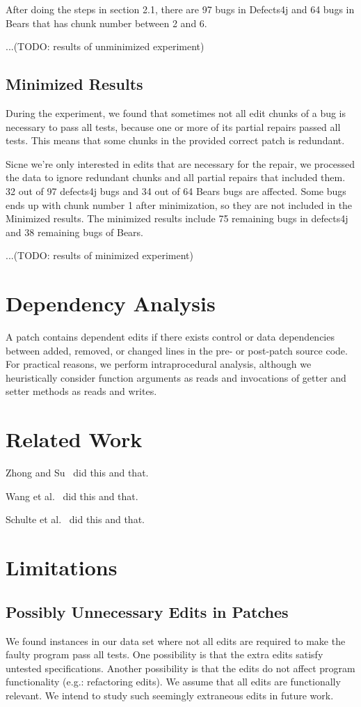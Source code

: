 \documentclass[sigconf, timestamp-false, anonymous=true]{acmart}
\begin{document}
After doing the steps in section 2.1, there are 97 bugs in Defects4j and 64 bugs in Bears that has chunk number between 2 and 6. 

...(TODO: results of unminimized experiment)

\subsection{Minimized Results}

During the experiment, we found that sometimes not all edit chunks of a bug is necessary to pass all tests, because one or more of its partial repairs passed all tests. This means that some chunks in the provided correct patch is redundant. 

Sicne we're only interested in edits that are necessary for the repair, we processed the data to ignore redundant chunks and all partial repairs that included them. 32 out of 97 defects4j bugs and 34 out of 64 Bears bugs are affected. Some bugs ends up with chunk number 1 after minimization, so they are not included in the Minimized results. The minimized results include 75 remaining bugs in defects4j and 38 remaining bugs of Bears.

...(TODO: results of minimized experiment)

\section{Dependency Analysis}

A patch contains dependent edits if there exists control or data dependencies 
between added, removed, or changed lines in the pre- or post-patch
source code. For practical reasons, we perform intraprocedural analysis, 
although we heuristically consider function arguments as reads 
and invocations of getter and setter methods as reads and writes.

\section{Related Work}
Zhong and Su~\cite{zhong2015} did this and that.

Wang et al.~\cite{wang2018} did this and that.

Schulte et al.~\cite{schulte} did this and that.

\section{Limitations}

\subsection{Possibly Unnecessary Edits in Patches}

We found instances in our data set where not all edits are required to 
make the faulty program pass all tests. One possibility is that the extra 
edits satisfy untested specifications. Another possibility is that the edits 
do not affect program functionality (e.g.: refactoring edits). We assume 
that all edits are functionally relevant. We intend to study such seemingly
extraneous edits in future work.



\end{document}
